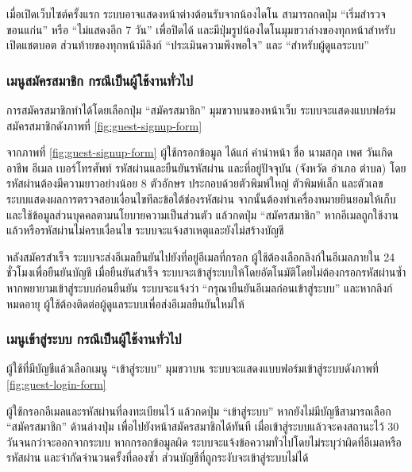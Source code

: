 เมื่อเปิดเว็บไซต์ครั้งแรก ระบบอาจแสดงหน้าต่างต้อนรับจากน้องไดโน สามารถกดปุ่ม ``เริ่มสำรวจขอนแก่น'' หรือ ``ไม่แสดงอีก 7 วัน'' เพื่อปิดได้ และมีปุ่มรูปน้องไดโนมุมขวาล่างของทุกหน้าสำหรับเปิดแชตบอต ส่วนท้ายของทุกหน้ามีลิงก์ ``ประเมินความพึงพอใจ'' และ ``สำหรับผู้ดูแลระบบ''

\subsubsection{เมนูสมัครสมาชิก กรณีเป็นผู้ใช้งานทั่วไป}

การสมัครสมาชิกทำได้โดยเลือกปุ่ม ``สมัครสมาชิก'' มุมขวาบนของหน้าเว็บ ระบบจะแสดงแบบฟอร์มสมัครสมาชิกดังภาพที่ \ref{fig:guest-signup-form}


จากภาพที่ \ref{fig:guest-signup-form} ผู้ใช้กรอกข้อมูล ได้แก่ คำนำหน้า ชื่อ นามสกุล เพศ วันเกิด อาชีพ อีเมล เบอร์โทรศัพท์ รหัสผ่านและยืนยันรหัสผ่าน และที่อยู่ปัจจุบัน (จังหวัด อำเภอ ตำบล) โดยรหัสผ่านต้องมีความยาวอย่างน้อย 8 ตัวอักษร ประกอบด้วยตัวพิมพ์ใหญ่ ตัวพิมพ์เล็ก และตัวเลข ระบบแสดงผลการตรวจสอบเงื่อนไขทีละข้อใต้ช่องรหัสผ่าน จากนั้นต้องทำเครื่องหมายยินยอมให้เก็บและใช้ข้อมูลส่วนบุคคลตามนโยบายความเป็นส่วนตัว แล้วกดปุ่ม ``สมัครสมาชิก'' หากอีเมลถูกใช้งานแล้วหรือรหัสผ่านไม่ครบเงื่อนไข ระบบจะแจ้งสาเหตุและยังไม่สร้างบัญชี

หลังสมัครสำเร็จ ระบบจะส่งอีเมลยืนยันไปยังที่อยู่อีเมลที่กรอก ผู้ใช้ต้องเลือกลิงก์ในอีเมลภายใน 24 ชั่วโมงเพื่อยืนยันบัญชี เมื่อยืนยันสำเร็จ ระบบจะเข้าสู่ระบบให้โดยอัตโนมัติโดยไม่ต้องกรอกรหัสผ่านซ้ำ หากพยายามเข้าสู่ระบบก่อนยืนยัน ระบบจะแจ้งว่า ``กรุณายืนยันอีเมลก่อนเข้าสู่ระบบ'' และหากลิงก์หมดอายุ ผู้ใช้ต้องติดต่อผู้ดูแลระบบเพื่อส่งอีเมลยืนยันใหม่ให้

\subsubsection{เมนูเข้าสู่ระบบ กรณีเป็นผู้ใช้งานทั่วไป}

ผู้ใช้ที่มีบัญชีแล้วเลือกเมนู ``เข้าสู่ระบบ'' มุมขวาบน ระบบจะแสดงแบบฟอร์มเข้าสู่ระบบดังภาพที่ \ref{fig:guest-login-form}


ผู้ใช้กรอกอีเมลและรหัสผ่านที่ลงทะเบียนไว้ แล้วกดปุ่ม ``เข้าสู่ระบบ'' หากยังไม่มีบัญชีสามารถเลือก ``สมัครสมาชิก'' ด้านล่างปุ่ม เพื่อไปยังหน้าสมัครสมาชิกได้ทันที เมื่อเข้าสู่ระบบแล้วจะคงสถานะไว้ 30 วันจนกว่าจะออกจากระบบ หากกรอกข้อมูลผิด ระบบจะแจ้งข้อความทั่วไปโดยไม่ระบุว่าผิดที่อีเมลหรือรหัสผ่าน และจำกัดจำนวนครั้งที่ลองซ้ำ ส่วนบัญชีที่ถูกระงับจะเข้าสู่ระบบไม่ได้

